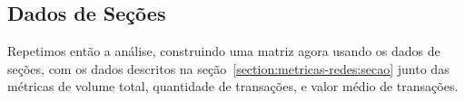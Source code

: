 
\subsection{Dados de Seções}
\label{section:deteccao-impacto:secao}

Repetimos então a análise, construindo uma matriz agora usando os dados de seções, com os dados descritos na seção~\ref{section:metricas-redes:secao} junto das métricas de volume total, quantidade de transações, e valor médio de transações.

